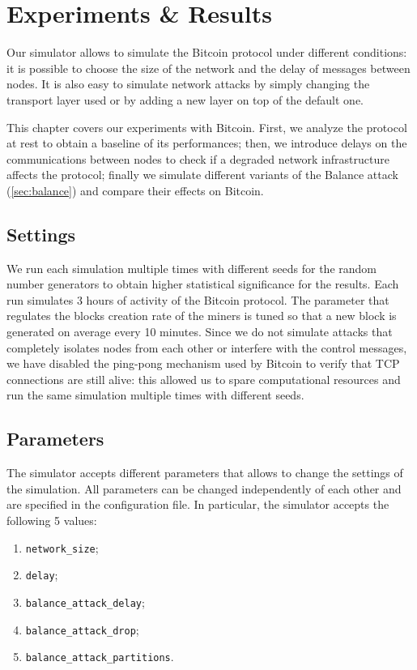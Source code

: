 \chapter{Experiments \& Results}
\label{chapter:results}
Our simulator allows to simulate the Bitcoin protocol under different conditions:
it is possible to choose the size of the network and the delay of messages between nodes.
It is also easy to simulate network attacks by simply changing the transport layer used or by adding a new layer on top of the default one.

\medskip
This chapter covers our experiments with Bitcoin.
First, we analyze the protocol at rest to obtain a baseline of its performances;
then, we introduce delays on the communications between nodes to check if a degraded network infrastructure affects the protocol;
finally we simulate different variants of the Balance attack (\cref{sec:balance}) and compare their effects on Bitcoin.


\section{Settings}
We run each simulation multiple times with different seeds for the random number generators to obtain higher statistical significance for the results.
Each run simulates \num{3} hours of activity of the Bitcoin protocol.
The parameter that regulates the blocks creation rate of the miners is tuned so that a new block is generated on average every \num{10} minutes.
Since we do not simulate attacks that completely isolates nodes from each other or interfere with the control messages, we have disabled the ping-pong mechanism used by Bitcoin to verify that TCP connections are still alive:
this allowed us to spare computational resources and run the same simulation multiple times with different seeds.


\section{Parameters}
The simulator accepts different parameters that allows to change the settings of the simulation.
All parameters can be changed independently of each other and are specified in the configuration file.
In particular, the simulator accepts the following \num{5} values:
\begin{enumerate}
	\item \texttt{network\_size};
	\item \texttt{delay};
	\item \texttt{balance\_attack\_delay};
	\item \texttt{balance\_attack\_drop};
	\item \texttt{balance\_attack\_partitions}.
\end{enumerate}

